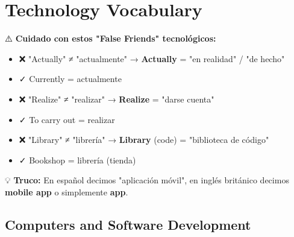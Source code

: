 \section{Technology Vocabulary}

\begin{spanishbox}[title=Para Hispanohablantes: Technology False Friends]
⚠️ \textbf{Cuidado con estos "False Friends" tecnológicos:}

\begin{itemize}
    \item ❌ "Actually" ≠ "actualmente" → \textbf{Actually} = "en realidad" / "de hecho"
    \item ✓ Currently = actualmente
    \item ❌ "Realize" ≠ "realizar" → \textbf{Realize} = "darse cuenta"
    \item ✓ To carry out = realizar
    \item ❌ "Library" ≠ "librería" → \textbf{Library} (code) = "biblioteca de código"
    \item ✓ Bookshop = librería (tienda)
\end{itemize}

💡 \textbf{Truco:} En español decimos "aplicación móvil", en inglés británico decimos \textbf{mobile app} o simplemente \textbf{app}.
\end{spanishbox}

\subsection{Computers and Software Development}

